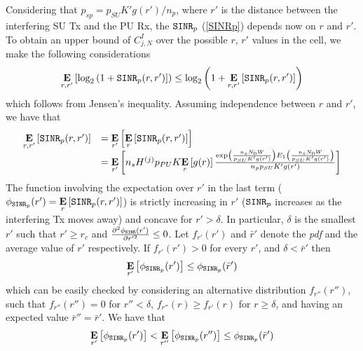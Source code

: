 Considering that $p_{sp}=p_{SU}K'g(r')/n_{p}$, where $r'$ is the distance between the interfering SU Tx and the PU Rx, the $\text{\ttfamily{SINR}}_{p}$ (\ref{SINRp}) depends now on $r$ and $r'$. To obtain an upper bound of $C^{I}_{j,N}$ over the possible $r$, $r'$ values in the cell, we make the following considerations
\begin{equation}
\underset{r,r'}{\mathbf{E}}\left[\text{log}_{2}\left(1+\text{\ttfamily{SINR}}_{p}(r,r')\right]\right) \leq \\
\text{log}_{2}\left(1+\underset{r,r'}{\mathbf{E}}\left[\text{\ttfamily{SINR}}_{p}(r,r')\right]\right)
\end{equation}
which follows from Jensen's inequality. Assuming independence between $r$ and $r'$, we have that
\begin{equation}\label{E_SINRp}
\begin{array}{ll}
\underset{r,r'}{\mathbf{E}}\left[\text{\ttfamily{SINR}}_{p}(r,r')\right] & =
\underset{r'}{\mathbf{E}}\left[\underset{r}{\mathbf{E}}\left[\text{\ttfamily{SINR}}_{p}(r,r')\right]\right] \\
& = \underset{r'}{\mathbf{E}}\left[n_{s}H^{(j)}p_{PU}K\underset{r}{\mathbf{E}}\left[g(r)\right]
\frac{\text{exp}\left(\frac{n_{s}N_{0}W}{p_{SU}K'g(r')}\right) E_{1}\left(\frac{n_{s}N_{0}W}{p_{SU}K'g(r')}\right)}{n_{p}p_{SU}K'g(r')}\right]
\end{array}
\end{equation}
The function involving the expectation over $r'$ in the last term ($\phi_{\text{\ttfamily{SINR}}_{p}}(r') = \underset{r}{\mathbf{E}}\left[\text{\ttfamily{SINR}}_{p}(r,r')\right]$) is strictly increasing in $r'$ ($\text{\ttfamily{SINR}}_{p}$ increases as the interfering Tx moves away) and concave for $r'>\delta$.
In particular, $\delta$ is the smallest $r'$ such that $r' \geq r_{c}$ and $\frac{\partial^{2}\phi_\text{\ttfamily{SINR}}(r')}{\partial r'^{2}} \leq 0$.
Let $f_{r'}(r')$ and $\bar{r}'$ denote the \textit{pdf} and the average value of $r'$ respectively. 
If $f_{r'}(r')>0$ for every $r'$, and $\delta<\bar{r}'$ then
\begin{equation}
\underset{r'}{\mathbf{E}}\left[\phi_{\text{\ttfamily{SINR}}_{p}}(r')\right] \leq
\phi_{\text{\ttfamily{SINR}}_{p}}(\bar{r}')
\end{equation}
which can be easily checked by considering an alternative distribution $f_{r''}(r'')$, such that $f_{r''}(r'')=0$ for $r''<\delta$, $f_{r''}(r)\geq f_{r'}(r)$ for $r\geq\delta$, and having an expected value $\bar{r}''=\bar{r}'$. We have that
\begin{equation}
\underset{r'}{\mathbf{E}}\left[\phi_{\text{\ttfamily{SINR}}_{p}}(r')\right] < \underset{r''}{\mathbf{E}}\left[\phi_{\text{\ttfamily{SINR}}_{p}}(r'')\right]
\leq \phi_{\text{\ttfamily{SINR}}_{p}}(\bar{r}')
\end{equation}
